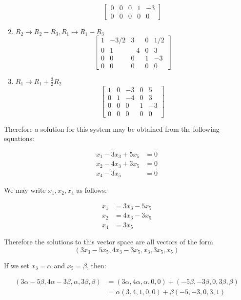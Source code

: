 \documentclass{article}
\begin{document}
\begin{enumerate}[(Step 1)]
\[\begin{bmatrix}
                  0 & 0    & 0  & 1 & -3   \\
                  0 & 0    & 0  & 0 & 0
              \end{bmatrix}
          \]
    \item $R_2 \to R_2-R_3, R_1 \to R_1 - R_3$
          \[
              \begin{bmatrix}
                  1 & -3/2 & 3  & 0 & 1/2 \\
                  0 & 1    & -4 & 0 & 3   \\
                  0 & 0    & 0  & 1 & -3  \\
                  0 & 0    & 0  & 0 & 0
              \end{bmatrix}
          \]
    \item $R_1 \to R_1+ \frac{3}{2}R_2$
          \[
              \begin{bmatrix}
                  1 & 0 & -3 & 0 & 5  \\
                  0 & 1 & -4 & 0 & 3  \\
                  0 & 0 & 0  & 1 & -3 \\
                  0 & 0 & 0  & 0 & 0
              \end{bmatrix}
          \]
\end{enumerate}

Therefore a solution for this system may be obtained from the following equations:

\begin{align*}
    x_1 - 3x_3 + 5x_5 & = 0 \\
    x_2 - 4x_3 + 3x_5 & = 0 \\
    x_4 - 3x_5        & = 0
\end{align*}

We may write $x_1, x_2, x_4$ as follows:


\begin{align*}
    x_1 & = 3x_3 - 5x_5 \\
    x_2 & = 4x_3 - 3x_5 \\
    x_4 & = 3x_5
\end{align*}

Therefore the solutions to this vector space are all vectors of the form \[(3x_3 - 5x_5, 4x_3 - 3x_5, x_3, 3x_5, x_5)\]

If we set $x_3 = \alpha$ and $x_5 = \beta$, then:

\begin{align*}
    (3\alpha - 5\beta, 4\alpha - 3\beta, \alpha, 3\beta, \beta) & = (3\alpha, 4\alpha, \alpha, 0, 0) + (- 5\beta, -3\beta, 0, 3\beta, \beta) \\
                                                                 & = \alpha (3, 4, 1, 0, 0) + \beta (-5, -3, 0, 3, 1)
\end{align*}
\end{document}
